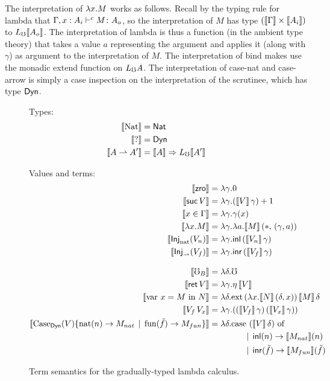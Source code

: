The interpretation of $\lambda {x} . {M}$ works as follows. Recall by the typing rule for
lambda that ${\Gamma, x : A_i} \vdash^c {M} \colon {{A_o}}$, so the interpretation of $M$
has type $(\llbracket {\Gamma} \rrbracket \times \llbracket {A_i} \rrbracket)$ to $L_\mho \llbracket {A_o} \rrbracket$.
The interpretation of lambda is thus a function (in the ambient type theory) that takes
a value $a$ representing the argument and applies it (along with $\gamma$) as argument to
the interpretation of $M$.
%
The interpretation of bind makes use the monadic extend function on $L_\mho A$.
%
The interpretation of case-nat and case-arrow is simply a case inspection on the
interpretation of the scrutinee, which has type $\mathsf{Dyn}$.


\vspace{2ex}


\begin{figure*}
  \noindent Types:
  \begin{align*}
    \llbracket {\text{Nat}} \rrbracket &= \mathsf{Nat} \\
    \llbracket {?} \rrbracket &= \mathsf{Dyn} \\
    \llbracket {A \rightharpoonup A'} \rrbracket &= \llbracket {A} \rrbracket \Rightarrow L_\mho \llbracket {A'} \rrbracket \\
  \end{align*}


  \noindent Values and terms:
  \begin{align*}
    \llbracket {\textsf{zro}} \rrbracket         &= \lambda \gamma . 0 \\
    \llbracket {\textsf{suc}\, V} \rrbracket     &= \lambda \gamma . (\llbracket {V} \rrbracket\, \gamma) + 1 \\
    \llbracket {x \in \Gamma} \rrbracket &= \lambda \gamma . \gamma(x) \\
    \llbracket {\lambda {x} . {M}} \rrbracket   &= \lambda \gamma . \lambda a . \llbracket {M} \rrbracket\, (*,\, (\gamma , a))  \\
    \llbracket {\textsf{Inj}_\text{nat} ({V_n})} \rrbracket &= \lambda \gamma . \mathsf{inl}\, (\llbracket {V_n} \rrbracket\, \gamma) \\
    \llbracket {\textsf{Inj}_\rightharpoonup({V_f})} \rrbracket &= \lambda \gamma . \mathsf{inr}\, (\llbracket {V_f} \rrbracket\, \gamma) \\[2ex]
    \llbracket {\mho_B} \rrbracket         &= \lambda \delta . \mho \\
    \llbracket {\mathsf{ret}\, V} \rrbracket       &= \lambda \gamma . \eta\, \llbracket {V} \rrbracket \\
    \llbracket {\text{var } {x} = {M} \text{ in } {N}} \rrbracket &= \lambda \delta . \text{ext}\,{(\lambda x . \llbracket {N} \rrbracket\, (\delta, x))}\,{\llbracket {M} \rrbracket\, \delta} \\
    \llbracket {V_f\, V_x} \rrbracket      &= \lambda \gamma . {({(\llbracket {V_f} \rrbracket\, \gamma)} \, {(\llbracket {V_x} \rrbracket\, \gamma)})} \\
    \llbracket {\text{Case}_{\mathsf{Dyn}}({V}) \{ \text{nat}({n}) \to {M_{nat}} \mathrel{\bf \,\mid\,}\text{fun}({\tilde{f}}) \to {M_{fun}} \}} \rrbracket &=
      \lambda \delta . \text{case $(\llbracket {V} \rrbracket\, \delta)$ of} \\ 
      &\quad\quad\quad\quad \mathrel{\bf \,\mid\,} \mathsf{inl}(n) \to \llbracket {M_{nat}} \rrbracket(n) \\
      &\quad\quad\quad\quad \mathrel{\bf \,\mid\,} \mathsf{inr}(\tilde{f}) \to \llbracket {M_{fun}} \rrbracket(\tilde{f})
  \end{align*}

  \caption{Term semantics for the gradually-typed lambda calculus.}
  \label{fig:term-semantics}
\end{figure*}
